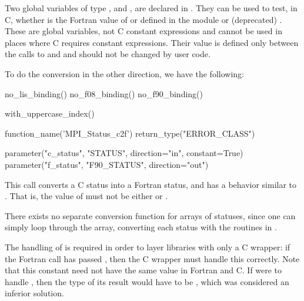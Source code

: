 Two global variables of type ,
 and ,
are declared in .  They can be used to test, in C, whether
 is the Fortran value of 
or 
defined in the  module or (deprecated) .
These are global
variables, not C constant expressions and cannot be used in places
where C requires constant expressions. Their value is defined only
between the calls to  and 
and should not be changed by user code.

To do the conversion in the other direction, we have the following:

%
\begin{mpi-binding}
    no_lis_binding()
    no_f08_binding()
    no_f90_binding()

    with_uppercase_index()

    function_name('MPI_Status_c2f')
    return_type("ERROR_CLASS")

    parameter("c_status", "STATUS", direction="in", constant=True)
    parameter("f_status", "F90_STATUS", direction="out")
\end{mpi-binding}

This call converts a C status into a Fortran status, and has a behavior
similar to .  That is, the value of
 must not be either  or
.

\begin{users}
There exists no separate
conversion function for arrays of statuses, since one
can simply loop through the array, converting each status
with the routines in .
\end{users}

\begin{rationale}
The handling of  is required in order to
layer libraries with only a C wrapper: if the Fortran call has passed
, then the C wrapper must handle this
correctly.
Note that this constant need not have the same value in
Fortran and C.  If  were to handle
, then the type of its result would have to be
, which was considered an inferior solution.
\end{rationale}

